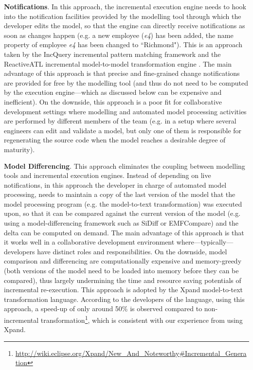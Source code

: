 \documentclass{llncs}
\begin{document}
\textbf{Notifications}. In this approach, the incremental execution engine needs to hook into the notification facilities provided by the modelling tool through which the developer edits the model, so that the engine can directly receive notifications as soon as changes happen (e.g. a new employee (\emph{e4}) has been added, the name property of employee \emph{e4} has been changed to ``Richmond"). This is an approach taken by the IncQuery incremental pattern matching framework \cite{rath2012derived} and the ReactiveATL incremental model-to-model transformation engine \cite{ogunyomi2015property}. The main advantage of this approach is that precise and fine-grained change notifications are provided for free by the modelling tool (and thus do not need to be computed by the execution engine---which as discussed below can be expensive and inefficient). On the downside, this approach is a poor fit for collaborative development settings where modelling and automated model processing activities are performed by different members of the team (e.g. in a setup where several engineers can edit and validate a model, but only one of them is responsible for regenerating the source code when the model reaches a desirable degree of maturity).

\textbf{Model Differencing}. This approach eliminates the coupling between modelling tools and incremental execution engines. Instead of depending on live notifications, in this approach the developer in charge of automated model processing, needs to maintain a copy of the last version of the model that the model processing program (e.g. the model-to-text transformation) was executed upon, so that it can be compared against the current version of the model (e.g. using a model-differencing framework such as SiDiff or EMFCompare) and the delta can be computed on demand. The main advantage of this approach is that it works well in a collaborative development environment where---typically---developers have distinct roles and responsibilities. On the downside, model comparison and differencing are computationally expensive and memory-greedy (both versions of the model need to be loaded into memory before they can be compared), thus largely undermining the time and resource saving potentials of incremental re-execution. This approach is adopted by the Xpand model-to-text transformation language. According to the developers of the language, using this approach, a speed-up of only around 50\% is observed compared to non-incremental transformation\footnote{\url{http://wiki.eclipse.org/Xpand/New_And_Noteworthy\#Incremental_Generation}}, which is consistent with our experience from using Xpand.
\end{document}
